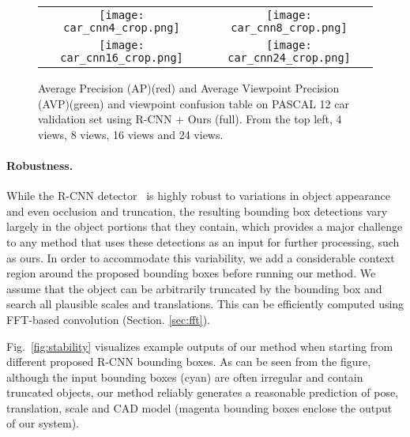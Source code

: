 \begin{figure}[h]
\setlength\tabcolsep{1pt}
\centering
\begin{tabular}{cc}
  \texttt{[image: car\_cnn4\_crop.png]} &   
  \texttt{[image: car\_cnn8\_crop.png]} \\   
  \texttt{[image: car\_cnn16\_crop.png]} &   
  \texttt{[image: car\_cnn24\_crop.png]} \\   
\end{tabular}
\caption{Average Precision (AP)(red) and Average Viewpoint Precision (AVP)(green)
  and viewpoint confusion table on PASCAL 12 car validation set using
  R-CNN + Ours (full). From the top left, 4 views, 8 views, 16 views
  and 24 views.}
  \label{fig:car_cnn_ap}
\end{figure}

\paragraph{Robustness.}
While the R-CNN detector~\cite{Girshick14} is highly robust to
variations in object appearance and even occlusion and truncation,
the resulting bounding box detections vary largely in the object
portions that they contain, which provides a major challenge to any
method that uses these detections as an input for further processing,
such as ours.
%
In order to accommodate this variability, we add a considerable context
region around the proposed bounding boxes before running our method.
We assume that the object can be arbitrarily truncated by the bounding
box and search all plausible scales and translations. This can be
efficiently computed using FFT-based convolution
(Section. \ref{sec:fft}).

Fig.~\ref{fig:stability} visualizes example outputs of our method when
starting from different proposed R-CNN bounding boxes. As can be seen
from the figure, although the input bounding boxes (cyan) are often
irregular and contain truncated objects, our method reliably
generates a reasonable prediction of pose, translation, scale and CAD
model (magenta bounding boxes enclose the output of our system).

